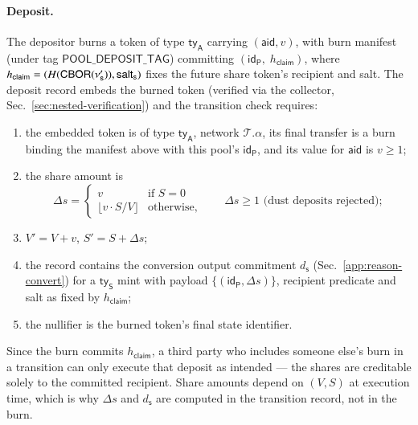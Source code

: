 \paragraph{Deposit.} The depositor burns a token of type $\mathsf{ty}_\mathsf{A}$ carrying $(\mathsf{aid}, v)$, with burn manifest (under tag $\mathsf{POOL\_DEPOSIT\_TAG}$) committing $(\mathsf{id}_\mathsf{P},\; h_\mathsf{claim})$, where $h_\mathsf{claim} = (H(\mathsf{CBOR}(\nu'_\mathsf{s})), \mathsf{salt}_\mathsf{s})$ fixes the future share token's recipient and salt. The deposit record embeds the burned token (verified via the collector, Sec.~\ref{sec:nested-verification}) and the transition check requires:
\begin{enumerate}
	\item the embedded token is of type $\mathsf{ty}_\mathsf{A}$, network $\mathcal{T}.\alpha$, its final transfer is a burn binding the manifest above with this pool's $\mathsf{id}_\mathsf{P}$, and its value for $\mathsf{aid}$ is $v \ge 1$;
	\item the share amount is
	\[
	\Delta s =
	\begin{cases}
		v & \text{if } S = 0\\
		\lfloor v \cdot S / V \rfloor & \text{otherwise,}
	\end{cases}
	\qquad \Delta s \ge 1 \text{ (dust deposits rejected)};
	\]
	\item $V' = V + v$, $S' = S + \Delta s$;
	\item the record contains the conversion output commitment $d_\mathsf{s}$ (Sec.~\ref{app:reason-convert}) for a $\mathsf{ty}_\mathsf{S}$ mint with payload $\{(\mathsf{id}_\mathsf{P}, \Delta s)\}$, recipient predicate and salt as fixed by $h_\mathsf{claim}$;
	\item the nullifier is the burned token's final state identifier.
\end{enumerate}
Since the burn commits $h_\mathsf{claim}$, a third party who includes someone else's burn in a transition can only execute that deposit as intended --- the shares are creditable solely to the committed recipient. Share amounts depend on $(V, S)$ at execution time, which is why $\Delta s$ and $d_\mathsf{s}$ are computed in the transition record, not in the burn.

